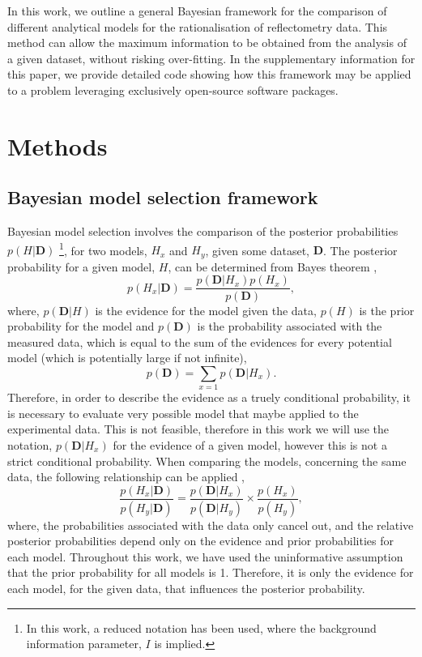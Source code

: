 \documentclass[
 reprint,
 superscriptaddress,
 amsmath,amssymb,
 aps,
]{revtex4-2}
\begin{document}
In this work, we outline a general Bayesian framework for the comparison of different analytical models for the rationalisation of reflectometry data. 
This method can allow the maximum information to be obtained from the analysis of a given dataset, without risking over-fitting.
In the supplementary information for this paper, we provide detailed code showing how this framework may be applied to a problem leveraging exclusively open-source software packages. 

\section{\label{methods} Methods}

\subsection{\label{bayes_mod} Bayesian model selection framework}

Bayesian model selection involves the comparison of the posterior probabilities $p(H|\mathbf{D})$ \footnote{In this work, a reduced notation has been used, where the background information parameter, $I$ is implied.}, for two models, $H_x$ and $H_y$, given some dataset, $\bm{D}$. 
The posterior probability for a given model, $H$, can be determined from Bayes theorem \cite{bayes_essay_1763}, 
%
\begin{equation}
    p(H_x|\bm{D}) = \frac{p(\bm{D}|H_x)p(H_x)}{p(\bm{D})},
\end{equation}
%
where, $p(\bm{D}|H)$ is the evidence for the model given the data, $p(H)$ is the prior probability for the model and $p(\bm{D})$ is the probability associated with the measured data, which is equal to the sum of the evidences for every potential model (which is potentially large if not infinite), 
%
\begin{equation}
    p(\bm{D}) = \sum_{x = 1}{p(\bm{D}|H_x)}.
\end{equation}
%
Therefore, in order to describe the evidence as a truely conditional probability, it is necessary to evaluate very possible model that maybe applied to the experimental data. 
This is not feasible, therefore in this work we will use the notation, $p(\bm{D}|H_x)$ for the evidence of a given model, however this is not a strict conditional probability. 
When comparing the models, concerning the same data, the following relationship can be applied \cite{pullen_bayesian_2014}, 
%
\begin{equation}
    \frac{p(H_x|\bm{D})}{p(H_y|\bm{D})} = \frac{p(\bm{D}|H_x)}{p(\bm{D}|H_y)} \times \frac{p(H_x)}{p(H_y)},
    \label{equ:ratio}
\end{equation}
%
where, the probabilities associated with the data only cancel out, and the relative posterior probabilities depend only on the evidence and prior probabilities for each model. 
Throughout this work, we have used the uninformative assumption that the prior probability for all models is \num{1}.
Therefore, it is only the evidence for each model, for the given data, that influences the posterior probability. 
\end{document}
